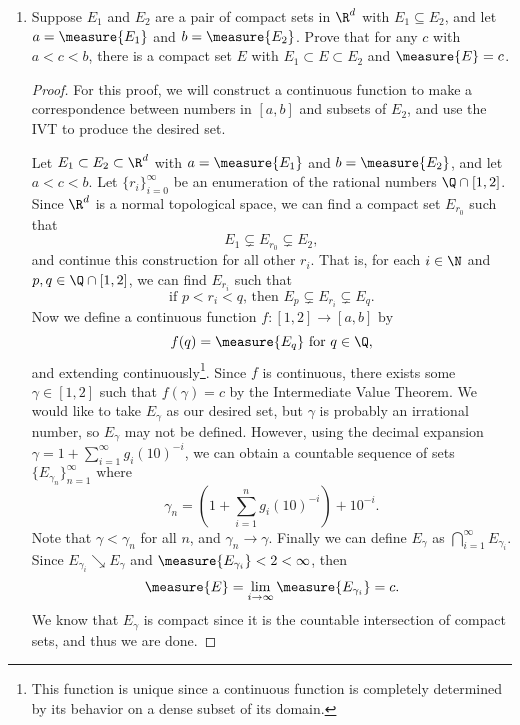 \documentclass[letterpaper]{article}
\begin{document}
\begin{enumerate}
\begin{enumerate}[label=(\alph*)]
\begin{enumerate}[label=\roman*]
\begin{proof}
         \textbf{Remaining questions: how does that construction help us? Why would the second term be open and of finite measure?} In fact, since we're given that $O^c$ is finite, then $O \cap B_R^c = B_R^c - O^c$ would seem to be a set of infinite exterior measure less something of finite exterior measure, and thus still having infinite exterior measure.

        \end{proof}
    \end{enumerate}
    \end{enumerate}

\setcounter{enumi}{26}
\item Suppose $E_1$ and $E_2$ are a pair of compact sets in $\R^d$ with $E_1\subseteq E_2$, and let $a=\measure{E_1}$ and $b=\measure{E_2}$. Prove that for any $c$ with $a<c<b$, there is a compact set $E$ with $E_1\subset E \subset E_2$ and $\measure{E}=c$.
\begin{proof}
For this proof, we will construct a continuous function to make a correspondence between numbers in $[a,b]$ and subsets of $E_2$, and use the IVT to produce the desired set.

Let $E_1\subset E_2\subset \R^d$ with $a=\measure{E_1}$ and $b=\measure{E_2}$, and let $a<c<b$. Let $\{r_i\}_{i=0}^\infty$ be an enumeration of the rational numbers $\Q\cap[1,2]$. Since $\R^d$ is a normal topological space, we can find a compact set $E_{r_0}$ such that $$E_1\subsetneq E_{r_0}\subsetneq E_2,$$ and continue this construction for all other $r_i$. That is, for each $i\in\N$ and $p,q\in\Q\cap[1,2]$, we can find $E_{r_i}$ such that
$$\text{if }p<r_i<q\text{, then }E_{p}\subsetneq E_{r_i}\subsetneq E_{q}.$$
Now we define a continuous function $f:[1,2]\to[a,b]\text{ by }$
$$f(q)=\measure{E_q} \text{ for } q\in\Q,$$ and extending continuously\footnote{This function is unique since a continuous function is completely determined by its behavior on a dense subset of its domain.}. Since $f$ is continuous, there exists some $\gamma\in[1,2]$ such that $f(\gamma)=c$ by the Intermediate Value Theorem. We would like to take $E_\gamma$ as our desired set, but $\gamma$ is probably an irrational number, so $E_\gamma$ may not be defined. However, using the decimal expansion $\gamma=1+\sum\limits_{i=1}^\infty g_i(10)^{-i}$, we can obtain a countable sequence of sets $\{E_{\gamma_n}\}_{n=1}^\infty\text{ where }$
$$\gamma_n=\left(1+\sum\limits_{i=1}^n g_i(10)^{-i}\right)+10^{-i}.$$
Note that $\gamma<\gamma_n$ for all $n$, and $\gamma_n\to\gamma$. Finally we can define $E_\gamma$ as $\bigcap_{i=1}^\infty E_{\gamma_i}$. Since $E_{\gamma_i}\searrow E_\gamma$ and $\measure{E_{\gamma_i}}<2<\infty$, then
$$\measure{E}=\lim\limits_{i\to\infty} \measure{E_{\gamma_i}}=c.$$
We know that $E_\gamma$ is compact since it is the countable intersection of compact sets, and thus we are done.
\end{proof}



\end{enumerate}
\end{document}
